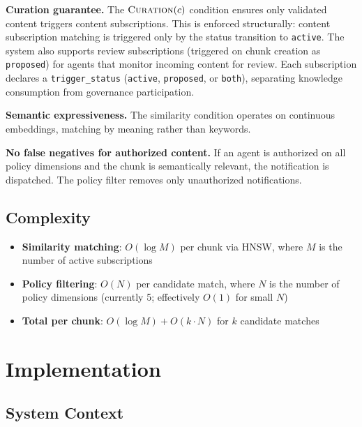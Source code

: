 \documentclass[11pt]{article}
\begin{document}
\textbf{Curation guarantee.} The $\textsc{Curation}(c)$ condition ensures only validated content triggers content subscriptions. This is enforced structurally: content subscription matching is triggered only by the status transition to \texttt{active}. The system also supports review subscriptions (triggered on chunk creation as \texttt{proposed}) for agents that monitor incoming content for review. Each subscription declares a \texttt{trigger\_status} (\texttt{active}, \texttt{proposed}, or \texttt{both}), separating knowledge consumption from governance participation.

\textbf{Semantic expressiveness.} The similarity condition operates on continuous embeddings, matching by meaning rather than keywords.

\textbf{No false negatives for authorized content.} If an agent is authorized on all policy dimensions and the chunk is semantically relevant, the notification is dispatched. The policy filter removes only unauthorized notifications.

\subsection{Complexity}

\begin{itemize}[leftmargin=*]
\item \textbf{Similarity matching}: $O(\log M)$ per chunk via HNSW, where $M$ is the number of active subscriptions
\item \textbf{Policy filtering}: $O(N)$ per candidate match, where $N$ is the number of policy dimensions (currently 5; effectively $O(1)$ for small $N$)
\item \textbf{Total per chunk}: $O(\log M) + O(k \cdot N)$ for $k$ candidate matches
\end{itemize}

\section{Implementation}

\subsection{System Context}
\end{document}
